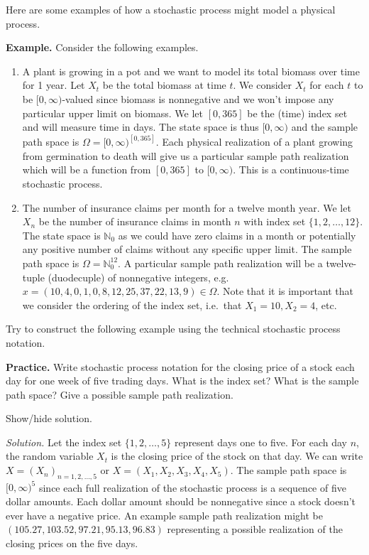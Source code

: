 \documentclass[
]{article}
\begin{document}
Here are some examples of how a stochastic process might model a
physical process.

\textbf{Example.} Consider the following examples.

\begin{enumerate}
\def\labelenumi{(\arabic{enumi})}
\item
  A plant is growing in a pot and we want to model its total biomass
  over time for 1 year. Let \(X_t\) be the total biomass at time \(t\). We
  consider \(X_t\) for each \(t\) to be \([0,\infty)\)-valued since biomass
  is nonnegative and we won't impose any particular upper limit on
  biomass. We let \([0,365]\) be the (time) index set and will measure
  time in days. The state space is thus \([0,\infty)\) and the sample
  path space is \(\Omega=[0,\infty)^{[0,365]}\). Each physical
  realization of a plant growing from germination to death will give
  us a particular sample path realization which will be a function
  from \([0,365]\) to \([0,\infty)\). This is a continuous-time stochastic
  process.
\item
  The number of insurance claims per month for a twelve month year. We
  let \(X_n\) be the number of insurance claims in month \(n\) with index
  set \(\{1,2,\ldots,12\}\). The state space is \(\mathbb N_0\) as we
  could have zero claims in a month or potentially any positive number
  of claims without any specific upper limit. The sample path space is
  \(\Omega=\mathbb N_0^{12}\). A particular sample path realization will
  be a twelve-tuple (duodecuple) of nonnegative integers, e.g.
  \(x=(10,4,0,1,0,8,12,25,37,22,13,9)\in\Omega\). Note that it is
  important that we consider the ordering of the index set, i.e.~that
  \(X_1=10, X_2=4\), etc.
\end{enumerate}

Try to construct the following example using the technical stochastic
process notation.

\textbf{Practice.} Write stochastic process notation for the closing price of
a stock each day for one week of five trading days. What is the index
set? What is the sample path space? Give a possible sample path
realization.

Show/hide solution.

\hypertarget{ex1}{}
\emph{Solution.} Let the index set \(\{1,2,\ldots,5\}\) represent days one to
five. For each day \(n\), the random variable \(X_t\) is the closing price
of the stock on that day. We can write \(X=(X_n)_{n=1,2,\ldots,5}\) or
\(X=(X_1,X_2,X_3,X_4,X_{5})\). The sample path space is \([0,\infty)^{5}\)
since each full realization of the stochastic process is a sequence of
five dollar amounts. Each dollar amount should be nonnegative since a
stock doesn't ever have a negative price. An example sample path
realization might be \((105.27,103.52,97.21,95.13,96.83)\) representing a
possible realization of the closing prices on the five days.
\end{document}
